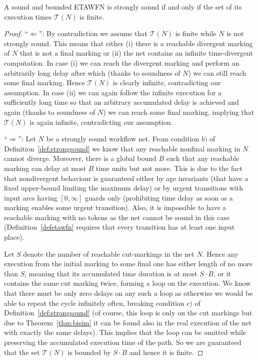 
\begin{lemma} \label{lem:finite}
A sound and bounded ETAWFN is strongly sound if and only if
the set of its execution times $\mathcal{T}(N)$ is finite.
\end{lemma}
\begin{proof}
``$\Leftarrow$'': By contradiction we assume that $\mathcal{T}(N)$
is finite while $N$ is not strongly sound. This means that either
(i) there is a reachable divergent marking of $N$ that is not a final marking
or (ii) the net contains an infinite time-divergent computation.
In case (i) we can reach the divergent marking and perform an
arbitrarily long delay after which (thanks to soundness of $N$)
we can still reach some final marking. Hence $\mathcal{T}(N)$ is
clearly infinite, contradicting our assumption. In case (ii)
we can again follow the infinite execution for a sufficiently long time so that
an arbitrary accumulated delay is achieved and again (thanks to soundness
of $N$) we can reach some final marking, implying that
$\mathcal{T}(N)$ is again infinite, contradicting our assumption.

``$\Rightarrow$'': Let $N$ be a strongly sound workflow net.
From condition $b)$ of Definition~\ref{def:strongsound}
we know that any reachable nonfinal marking
in $N$ cannot diverge. Moreover, there is a global bound $B$ such
that any reachable marking can delay at most $B$ time units but not more.
This is due to the fact that nondivergent behaviour is guaranteed either
by age invariants (that have a fixed upper-bound limiting the maximum
delay) or by urgent transitions with input arcs having $[0,\infty]$ guards
only (prohibiting time delay as soon as a marking enables some urgent
transition).
 Also, it is impossible to have a reachable marking with
no tokens as the net cannot be sound in this case (Definition~\ref{defetawfn}
requires that every transition has at least one input place).

Let $S$ denote the number of reachable cut-markings
in the net $N$.
Hence any execution from the initial marking to some final one has either
length of no more than $S$, meaning that its accumulated time duration
is at most $S\cdot B$, or it contains the same cut marking twice, forming a loop
on the execution.
We know that there must be only zero delays on
any such a loop as otherwise we would be able to repeat the cycle
infinitely often, breaking condition $c)$ of Definition~\ref{def:strongsound}
(of course, this loop is only on the cut markings but due to
Theorem~\ref{thm:bisim} it can be found also in the real execution of the net
with exactly the same delays).
This implies that the loop can be omitted while preserving
the accumulated execution time of the path.
So we are guaranteed that the set $\mathcal{T}(N)$ is bounded by $S\cdot B$
and hence it is finite.
\end{proof}



